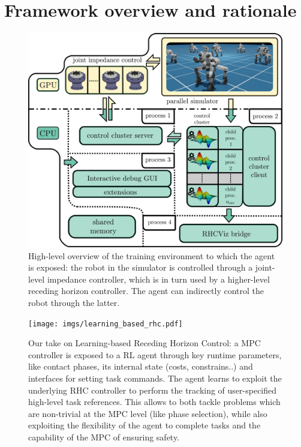 \section{Framework overview and rationale}

\begin{figure}[t]
	\centering
	\includegraphics[width=1.0\columnwidth]{imgs/cocluster_arch.pdf}
	\caption{High-level overview of the training environment to which the agent is exposed: the robot in the simulator is controlled through a joint-level impedance controller, which is in turn used by a higher-level receding horizon controller. The agent can indirectly control the robot through the latter.}
	\label{fig:coclbridge_arch}
\end{figure}
\cite{mystuff::lrhccontrol}
\cite{mystuff::omnirobogym}
\cite{mystuff::coclusterbridge}
\cite{mystuff::rhcviz}
\cite{mystuff::sharsoripcpp}

\begin{figure}[t]
	\centering
	\vspace{0.1cm}
	\texttt{[image: imgs/learning\_based\_rhc.pdf]}
	\caption{Our take on Learning-based Receding Horizon Control: a MPC controller is exposed to a RL agent through key runtime parameters, like contact phases, its internal state (costs, constrains..) and interfaces for setting task commands. The agent learns to exploit the underlying RHC controller to perform the tracking of user-specified high-level task references. This allows to both tackle problems which are non-trivial at the MPC level (like phase selection), while also exploiting the flexibility of the agent to complete tasks and the capability of the MPC of ensuring safety.}
	\label{fig:lrhc_arch}
\end{figure}